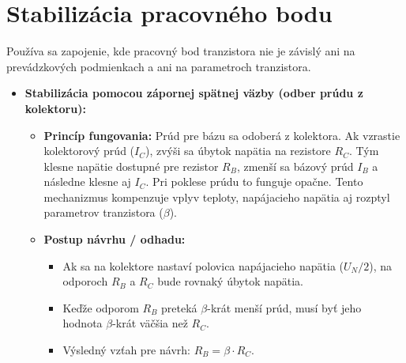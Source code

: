 \section{Stabilizácia pracovného bodu}
Používa sa zapojenie, kde pracovný bod tranzistora nie je závislý ani na prevádzkových podmienkach a ani na parametroch tranzistora.
\begin{itemize}
	\item \textbf{Stabilizácia pomocou zápornej spätnej väzby (odber prúdu z kolektoru):}
	\begin{itemize}
		\item \textbf{Princíp fungovania:} Prúd pre bázu sa odoberá z kolektora. Ak vzrastie kolektorový prúd ($I_C$), zvýši sa úbytok napätia na rezistore $R_C$. Tým klesne napätie dostupné pre rezistor $R_B$, zmenší sa bázový prúd $I_B$ a následne klesne aj $I_C$. Pri poklese prúdu to funguje opačne. Tento mechanizmus kompenzuje vplyv teploty, napájacieho napätia aj rozptyl parametrov tranzistora ($\beta$).
		\item \textbf{Postup návrhu / odhadu:} 
		\begin{itemize}
			\item Ak sa na kolektore nastaví polovica napájacieho napätia ($U_N / 2$), na odporoch $R_B$ a $R_C$ bude rovnaký úbytok napätia.
			\item Keďže odporom $R_B$ preteká $\beta$-krát menší prúd, musí byť jeho hodnota $\beta$-krát väčšia než $R_C$.
			\item Výsledný vzťah pre návrh: $R_B = \beta \cdot R_C$.
		\end{itemize}
	\end{itemize}
	

\end{itemize}
